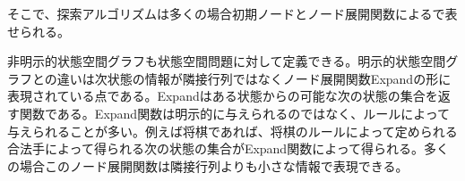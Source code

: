 そこで、探索アルゴリズムは多くの場合初期ノードとノード展開関数によるで表せられる。


非明示的状態空間グラフも状態空間問題に対して定義できる。明示的状態空間グラフとの違いは次状態の情報が隣接行列ではなくノード展開関数Expandの形に表現されている点である。Expandはある状態からの可能な次の状態の集合を返す関数である。Expand関数は明示的に与えられるのではなく、ルールによって与えられることが多い。例えば将棋であれば、将棋のルールによって定められる合法手によって得られる次の状態の集合がExpand関数によって得られる。多くの場合このノード展開関数は隣接行列よりも小さな情報で表現できる。

